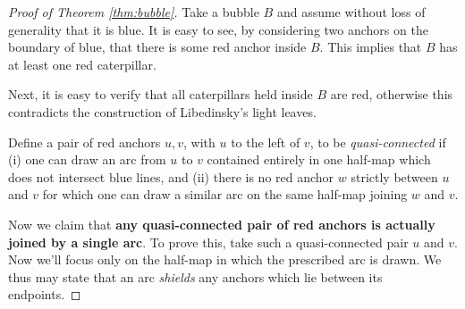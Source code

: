 \begin{proof}[Proof of Theorem \ref{thm:bubble}]
	Take a bubble $B$ and assume without loss of generality that it is blue.  It is easy to see, by considering two anchors on the boundary of blue, that there is some red anchor inside $B$.  This implies that $B$ has at least one red caterpillar.

	Next, it is easy to verify that all caterpillars held inside $B$ are red, otherwise this contradicts the construction of Libedinsky's light leaves.

	Define a pair of red anchors $u, v$, with $u$ to the left of $v$, to be \emph{quasi-connected} if (i) one can draw an arc from $u$ to $v$ contained entirely in one half-map which does not intersect blue lines, and (ii) there is no red anchor $w$ strictly between $u$ and $v$ for which one can draw a similar arc on the same half-map joining $w$ and $v$.

	Now we claim that \textbf{any quasi-connected pair of red anchors is actually joined by a single arc}.  To prove this, take such a quasi-connected pair $u$ and $v$.  Now we'll focus only on the half-map in which the prescribed arc is drawn.  We thus may state that an arc \emph{shields} any anchors which lie between its endpoints.
	

\end{proof}
